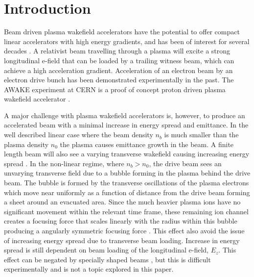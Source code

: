 \documentclass[aps,prstab,reprint,amsmath,amssymb,groupedaddress]{revtex4-1}
\begin{document}
\section[\label{S:I}]{Introduction}

Beam driven plasma wakefield accelerators have the potential to offer compact linear accelerators with high energy
gradients, and has been of interest for several decades \cite{chen:1985}. A relativist beam travelling through a plasma
will excite a strong longitudinal e-field that can be loaded by a trailing witness beam, which can achieve a high
acceleration gradient. Acceleration of an electron beam by an electron drive bunch has been demonstrated experimentally
\cite{rosenzweig:1988, blumenfeld:2007, kallos:2008} in the past. The AWAKE experiment at CERN is a proof of concept
proton driven plasma wakefield accelerator \cite{awake_collaboration:2014}.

A major challenge with plasma wakefield accelerators is, however, to produce an accelerated beam with a minimal increase
in energy spread and emittance. In the well described linear case where the beam density $n_{b}$ is much smaller than
the plasma density $n_{0}$ the plasma causes emittance growth in the beam. A finite length beam will also see a varying
transverse wakefield causing increasing energy spread \cite{katsouleas:1987}. In the non-linear regime, where
$n_{b} > n_{0}$, the drive beam sees an unvarying transverse field due to a bubble forming in the plasma behind the
drive beam. The bubble is formed by the transverse oscillations of the plasma electrons which move near uniformly as a
function of distance from the drive beam forming a sheet around an evacuated area. Since the much heavier plasma ions
have no significant movement within the relevant time frame, these remaining ion channel creates a focusing force that
scales linearly with the radius within this bubble producing a angularly symmetric focusing force
\cite{lu:2006-1, lu:2006}. This effect also avoid the issue of increasing energy spread due to transverse beam loading.
Increase in energy spread is still dependent on beam loading of the longitudinal e-field, $E_{z}$. This effect can be
negated by specially shaped beams \cite{katsouleas:1987, tzoufras:2009}, but this is difficult experimentally and is not
a topic explored in this paper.
\end{document}

